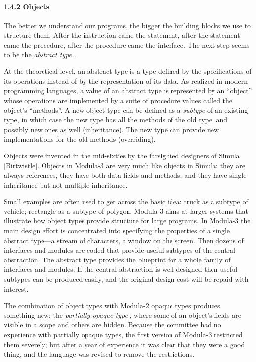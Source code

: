 \documentclass[10pt]{article}
\begin{document}
\paragraph{1.4.2 Objects}

The better we understand our programs, the bigger the building blocks we use
to structure them.  After the instruction came the statement, after the
statement came the procedure, after the procedure came the interface.  The next
step seems to be the \emph{abstract type} .

At the theoretical level, an abstract type is a type defined by the
specifications of its operations instead of by the representation of its
data.  As realized in modern programming languages, a value of an abstract type
is represented by an ``object'' whose operations are implemented by a suite of
procedure values called the object's ``methods''.  A new object type can be
defined as a \emph{subtype} of an existing type, in which case the new type
has all the methods of the old type, and possibly new ones as well
(inheritance).  The new type can provide new implementations for the old
methods (overriding).

Objects were invented in the mid-sixties by the farsighted designers of Simula
[Birtwistle].  Objects in Modula-3 are very much like objects in Simula: they
are always references, they have both data fields and methods, and they have
single inheritance but not multiple inheritance.

Small examples are often used to get across the basic idea: truck as a subtype
of vehicle; rectangle as a subtype of polygon.  Modula-3 aims at larger systems
that illustrate how object types provide structure for large programs.  In
Modula-3 the main design effort is concentrated into specifying the properties
of a single abstract type---a stream of characters, a window on the
screen.  Then dozens of interfaces and modules are coded that provide useful
subtypes of the central abstraction.  The abstract type provides the blueprint
for a whole family of interfaces and modules.  If the central abstraction is
well-designed then useful subtypes can be produced easily, and the original
design cost will be repaid with interest.

The combination of object types with Modula-2 opaque types produces something
new: the \emph{partially opaque type} , where some of an object's fields are
visible in a scope and others are hidden.  Because the committee had no
experience with partially opaque types, the first version of Modula-3
restricted them severely; but after a year of experience it was clear that
they were a good thing, and the language was revised to remove the
restrictions.
\end{document}
